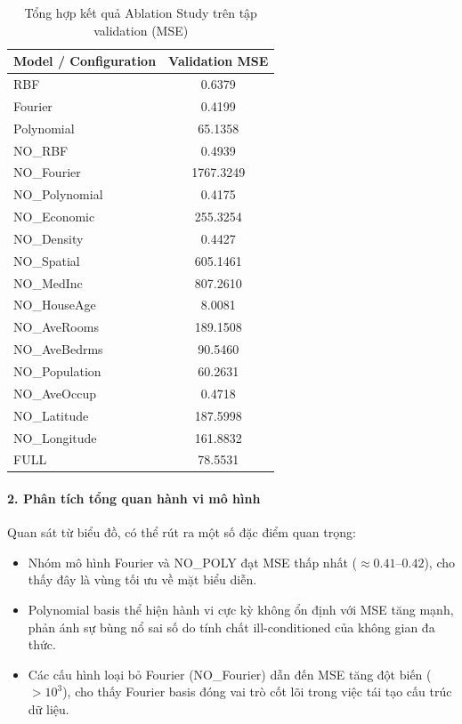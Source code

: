 \begin{table}[htbp]
\centering
\renewcommand{\arraystretch}{1.2}
\begin{tabular}{|l|c|}
\hline
\textbf{Model / Configuration} & \textbf{Validation MSE} \\
\hline
RBF               & 0.6379 \\
Fourier           & 0.4199 \\
Polynomial        & 65.1358 \\
NO\_RBF           & 0.4939 \\
NO\_Fourier       & 1767.3249 \\
NO\_Polynomial    & 0.4175 \\
NO\_Economic      & 255.3254 \\
NO\_Density       & 0.4427 \\
NO\_Spatial       & 605.1461 \\
NO\_MedInc        & 807.2610 \\
NO\_HouseAge      & 8.0081 \\
NO\_AveRooms      & 189.1508 \\
NO\_AveBedrms     & 90.5460 \\
NO\_Population    & 60.2631 \\
NO\_AveOccup      & 0.4718 \\
NO\_Latitude      & 187.5998 \\
NO\_Longitude     & 161.8832 \\
FULL              & 78.5531 \\
\hline
\end{tabular}
\caption{Tổng hợp kết quả Ablation Study trên tập validation (MSE)}
\label{tab:ablation_summary}
\end{table}

\paragraph{2. Phân tích tổng quan hành vi mô hình}

Quan sát từ biểu đồ, có thể rút ra một số đặc điểm quan trọng:

\begin{itemize}
    \item Nhóm mô hình Fourier và NO\_POLY đạt MSE thấp nhất ($\approx 0.41$--$0.42$),
    cho thấy đây là vùng tối ưu về mặt biểu diễn.

    \item Polynomial basis thể hiện hành vi cực kỳ không ổn định với MSE tăng mạnh,
    phản ánh sự bùng nổ sai số do tính chất ill-conditioned của không gian đa thức.

    \item Các cấu hình loại bỏ Fourier (NO\_Fourier) dẫn đến MSE tăng đột biến
    ($> 10^3$), cho thấy Fourier basis đóng vai trò cốt lõi trong việc tái tạo
    cấu trúc dữ liệu.

\end{itemize}

